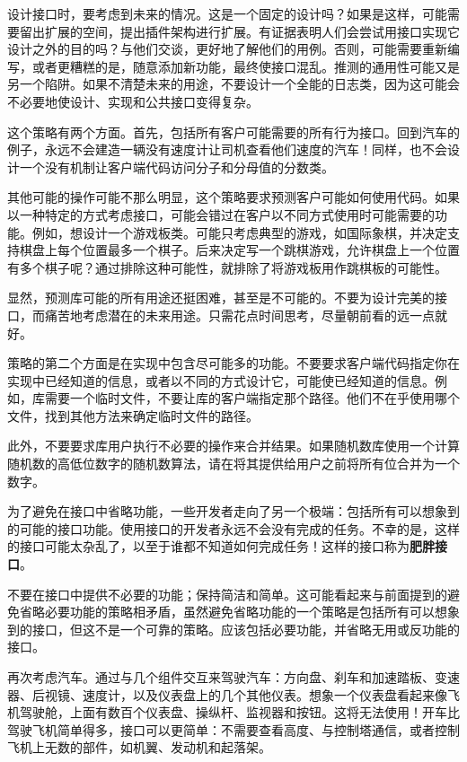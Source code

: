设计接口时，要考虑到未来的情况。这是一个固定的设计吗？如果是这样，可能需要留出扩展的空间，提出插件架构进行扩展。有证据表明人们会尝试用接口实现它设计之外的目的吗？与他们交谈，更好地了解他们的用例。否则，可能需要重新编写，或者更糟糕的是，随意添加新功能，最终使接口混乱。推测的通用性可能又是另一个陷阱。如果不清楚未来的用途，不要设计一个全能的日志类，因为这可能会不必要地使设计、实现和公共接口变得复杂。

这个策略有两个方面。首先，包括所有客户可能需要的所有行为接口。回到汽车的例子，永远不会建造一辆没有速度计让司机查看他们速度的汽车！同样，也不会设计一个没有机制让客户端代码访问分子和分母值的分数类。

其他可能的操作可能不那么明显，这个策略要求预测客户可能如何使用代码。如果以一种特定的方式考虑接口，可能会错过在客户以不同方式使用时可能需要的功能。例如，想设计一个游戏板类。可能只考虑典型的游戏，如国际象棋，并决定支持棋盘上每个位置最多一个棋子。后来决定写一个跳棋游戏，允许棋盘上一个位置有多个棋子呢？通过排除这种可能性，就排除了将游戏板用作跳棋板的可能性。

显然，预测库可能的所有用途还挺困难，甚至是不可能的。不要为设计完美的接口，而痛苦地考虑潜在的未来用途。只需花点时间思考，尽量朝前看的远一点就好。

策略的第二个方面是在实现中包含尽可能多的功能。不要要求客户端代码指定你在实现中已经知道的信息，或者以不同的方式设计它，可能使已经知道的信息。例如，库需要一个临时文件，不要让库的客户端指定那个路径。他们不在乎使用哪个文件，找到其他方法来确定临时文件的路径。

此外，不要要求库用户执行不必要的操作来合并结果。如果随机数库使用一个计算随机数的高低位数字的随机数算法，请在将其提供给用户之前将所有位合并为一个数字。


为了避免在接口中省略功能，一些开发者走向了另一个极端：包括所有可以想象到的可能的接口功能。使用接口的开发者永远不会没有完成的任务。不幸的是，这样的接口可能太杂乱了，以至于谁都不知道如何完成任务！这样的接口称为\textbf{肥胖接口}。

不要在接口中提供不必要的功能；保持简洁和简单。这可能看起来与前面提到的避免省略必要功能的策略相矛盾，虽然避免省略功能的一个策略是包括所有可以想象到的接口，但这不是一个可靠的策略。应该包括必要功能，并省略无用或反功能的接口。

再次考虑汽车。通过与几个组件交互来驾驶汽车：方向盘、刹车和加速踏板、变速器、后视镜、速度计，以及仪表盘上的几个其他仪表。想象一个仪表盘看起来像飞机驾驶舱，上面有数百个仪表盘、操纵杆、监视器和按钮。这将无法使用！开车比驾驶飞机简单得多，接口可以更简单：不需要查看高度、与控制塔通信，或者控制飞机上无数的部件，如机翼、发动机和起落架。


